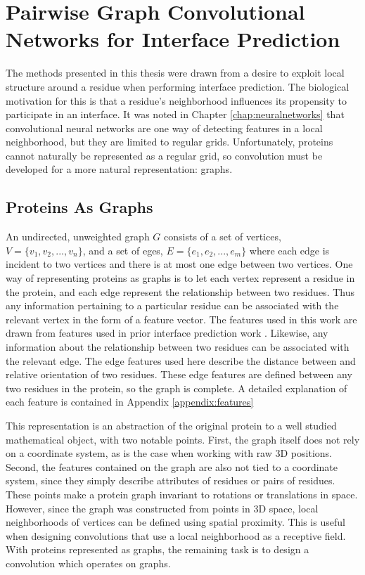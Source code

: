 \chapter{Pairwise Graph Convolutional Networks for Interface Prediction}
\label{chap:methods}

The methods presented in this thesis were drawn from a desire to exploit local structure around a residue when performing interface prediction.
The biological motivation for this is that a residue's neighborhood influences its propensity to participate in an interface.
It was noted in Chapter \ref{chap:neuralnetworks} that convolutional neural networks are one way of detecting features in a local neighborhood, but they are limited to regular grids. 
Unfortunately, proteins cannot naturally be represented as a regular grid, so convolution must be developed for a more natural representation: graphs.


\section{Proteins As Graphs}

An undirected, unweighted graph $G$ consists of a set of vertices, $V=\{v_1, v_2, ..., v_n\}$, and a set of eges, $E=\{e_1, e_2, ..., e_m\}$ where each edge is incident to two vertices and there is at most one edge between two vertices.
One way of representing proteins as graphs is to let each vertex represent a residue in the protein, and each edge represent the relationship between two residues.
Thus any information pertaining to a particular residue can be associated with the relevant vertex in the form of a feature vector.
The features used in this work are drawn from features used in prior interface prediction work \cite{minhas2014}.
Likewise, any information about the relationship between two residues can be associated with the relevant edge.
The edge features used here describe the distance between and relative orientation of two residues.
These edge features are defined between any two residues in the protein, so the graph is complete. 
A detailed explanation of each feature is contained in Appendix \ref{appendix:features}

This representation is an abstraction of the original protein to a well studied mathematical object, with two notable points.
First, the graph itself does not rely on a coordinate system, as is the case when working with raw 3D positions.
Second, the features contained on the graph are also not tied to a coordinate system, since they simply describe attributes of residues or pairs of residues.
These points make a protein graph invariant to rotations or translations in space. 
However, since the graph was constructed from points in 3D space, local neighborhoods of vertices can be defined using spatial proximity.
This is useful when designing convolutions that use a local neighborhood as a receptive field.
With proteins represented as graphs, the remaining task is to design a convolution which operates on graphs. 

